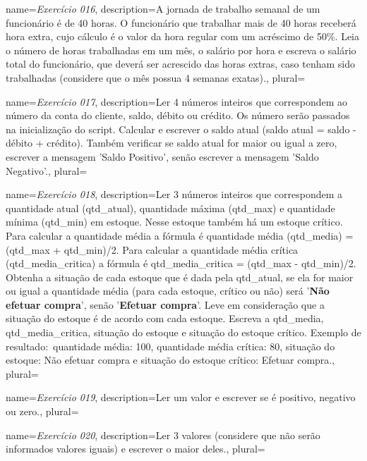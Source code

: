 {
	name={\textit{Exercício 016}},
	description={A jornada de trabalho semanal de um funcionário é de 40 horas. O funcionário que trabalhar mais de 40 horas receberá hora extra, cujo cálculo é o valor da hora regular com um acréscimo de 50\%. Leia o número de horas trabalhadas em um mês, o salário por hora e escreva o salário total do funcionário, que deverá ser acrescido das horas extras, caso tenham sido trabalhadas (considere que o mês possua 4 semanas exatas).},
	plural={}
}



{
	name={\textit{Exercício 017}},
	description={Ler 4 números inteiros que correspondem ao número da conta do cliente, saldo, débito ou crédito. Os número serão passados na inicialização do script. Calcular e escrever o saldo atual (saldo atual = saldo - débito + crédito). Também verificar se saldo atual for maior ou igual a zero, escrever a mensagem 'Saldo Positivo', senão escrever a mensagem 'Saldo Negativo'.},
	plural={}
}


{
	name={\textit{Exercício 018}},
	description={Ler 3 números inteiros que correspondem a quantidade atual (qtd\_atual), quantidade máxima (qtd\_max) e quantidade mínima (qtd\_min) em estoque. Nesse estoque também há um estoque crítico. Para calcular a quantidade média a fórmula é quantidade média (qtd\_media) = (qtd\_max + qtd\_min)/2. Para calcular a quantidade média crítica (qtd\_media\_critica) a fórmula é qtd\_media\_critica = (qtd\_max - qtd\_min)/2. Obtenha a situação de cada estoque que é dada pela qtd\_atual, se ela for maior ou igual a quantidade média (para cada estoque, crítico ou não) será '\textbf{Não efetuar compra}', senão '\textbf{Efetuar compra}'. Leve em consideração que a situação do estoque é de acordo com cada estoque. Escreva a qtd\_media, qtd\_media\_critica, situação do estoque e situação do estoque crítico. Exemplo de resultado:\ quantidade média: 100, quantidade média crítica: 80, situação do estoque: Não efetuar compra e situação do estoque crítico: Efetuar compra.},
	plural={}
}



{
	name={\textit{Exercício 019}},
	description={Ler um valor e escrever se é positivo, negativo ou zero.},
	plural={}
}



{
	name={\textit{Exercício 020}},
	description={Ler 3 valores (considere que não serão informados valores iguais) e escrever o maior deles.},
	plural={}
}


